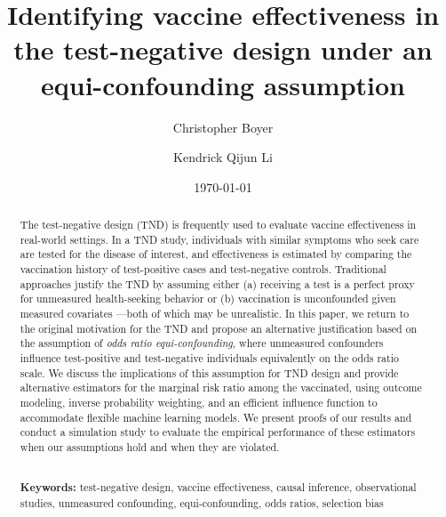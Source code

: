 \documentclass[11pt]{article}
\begin{document}
\begin{titlepage}
\title{Identifying vaccine effectiveness in the test-negative design under an equi-confounding assumption}
\author[1]{Christopher Boyer}%
\author[2]{Kendrick Qijun Li}
\date{\today\vspace{-1em}}
\maketitle

\begin{abstract}
    The test-negative design (TND) is frequently used to evaluate vaccine effectiveness in real-world settings. In a TND study, individuals with similar symptoms who seek care are tested for the disease of interest, and effectiveness is estimated by comparing the vaccination history of test-positive cases and test-negative controls. Traditional approaches justify the TND by assuming either (a) receiving a test is a perfect proxy for unmeasured health-seeking behavior or (b) vaccination is unconfounded given measured covariates ---both of which may be unrealistic. In this paper, we return to the original motivation for the TND and propose an alternative justification based on the assumption of \textit{odds ratio equi-confounding}, where unmeasured confounders influence test-positive and test-negative individuals equivalently on the odds ratio scale. We discuss the implications of this assumption for TND design and provide alternative estimators for the marginal risk ratio among the vaccinated, using outcome modeling, inverse probability weighting, and an efficient influence function to accommodate flexible machine learning models. We present proofs of our results and conduct a simulation study to evaluate the empirical performance of these estimators when our assumptions hold and when they are violated.

\noindent \\
\noindent\textbf{Keywords:} test-negative design, vaccine effectiveness, causal inference, observational studies, unmeasured confounding, equi-confounding, odds ratios, selection bias
\bigskip
\end{abstract}
\setcounter{page}{0}
\thispagestyle{empty}
\end{titlepage}
\pagebreak \newpage
\end{document}
